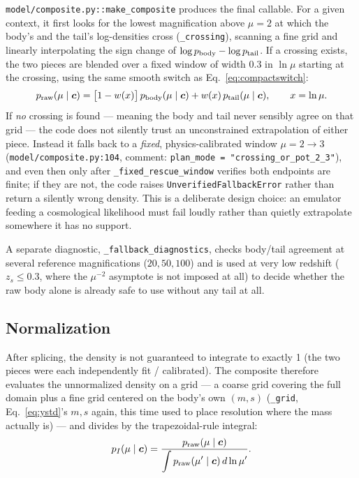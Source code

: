\documentclass[11pt]{article}
\newcommand{\code}[1]{\texttt{#1}}
\newcommand{\file}[1]{\texttt{#1}}
\newcommand{\vect}[1]{\boldsymbol{#1}}
\begin{document}
\file{model/composite.py::make\_composite} produces the final callable. For
a given context, it first looks for the lowest magnification above $\mu=2$
at which the body's and the tail's log-densities cross
(\code{\_crossing}), scanning a fine grid and linearly interpolating the
sign change of $\log p_{\rm body}-\log p_{\rm tail}$. If a crossing exists,
the two pieces are blended over a fixed window of width 0.3 in $\ln\mu$
starting at the crossing, using the same smooth switch as
Eq.~\ref{eq:compactswitch}:
\begin{equation}
 p_{\rm raw}(\mu\mid\vect c) = \big[1-w(x)\big]\,p_{\rm body}(\mu\mid\vect
 c) + w(x)\,p_{\rm tail}(\mu\mid\vect c), \qquad x=\ln\mu.
 \label{eq:splice}
\end{equation}
If \emph{no} crossing is found — meaning the body and tail never
sensibly agree on that grid — the code does not silently trust an
unconstrained extrapolation of either piece. Instead it falls back to a
\emph{fixed}, physics-calibrated window $\mu=2\to3$
(\file{model/composite.py:104}, comment: \code{plan\_mode =
"crossing\_or\_pot\_2\_3"}), and even then only after
\code{\_fixed\_rescue\_window} verifies both endpoints are finite; if they
are not, the code raises \code{UnverifiedFallbackError} rather than return
a silently wrong density. This is a deliberate design choice: an emulator
feeding a cosmological likelihood must fail loudly rather than quietly
extrapolate somewhere it has no support.

A separate diagnostic, \code{\_fallback\_diagnostics}, checks body/tail
agreement at several reference magnifications ($20,50,100$) and is used at
very low redshift ($z_s\le0.3$, where the $\mu^{-2}$ asymptote is not
imposed at all) to decide whether the raw body alone is already safe to use
without any tail at all.

\subsection{Normalization}

After splicing, the density is not guaranteed to integrate to exactly 1
(the two pieces were each independently fit / calibrated). The composite
therefore evaluates the unnormalized density on a grid — a coarse grid
covering the full domain plus a fine grid centered on the body's own
$(m,s)$ (\code{\_grid}, Eq.~\ref{eq:ystd}'s $m,s$ again, this time used to
place resolution where the mass actually is) — and divides by the
trapezoidal-rule integral:
\begin{equation}
 p_I(\mu\mid\vect c) = \frac{p_{\rm raw}(\mu\mid\vect c)}{\displaystyle\int
 p_{\rm raw}(\mu'\mid\vect c)\,d\ln\mu'}.
 \label{eq:renorm}
\end{equation}
\end{document}
